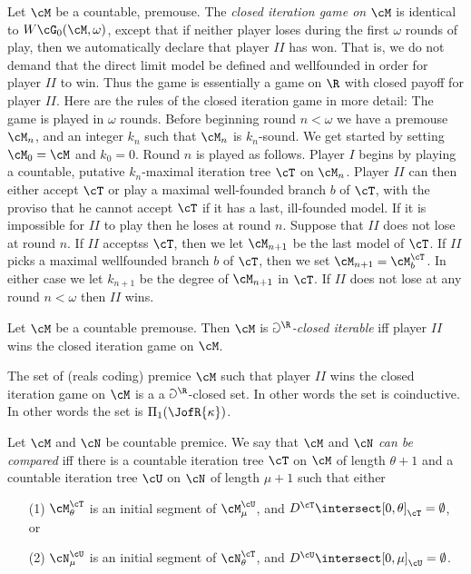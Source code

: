 Let $\cM$ be a countable, premouse. The \emph{closed iteration game on
$\cM$}  is identical to $W\cG_{0}(\cM,\omega)$,
except that if neither player loses during  the first
$\omega$ rounds of play, then we automatically
declare that player $II$ has won.
That is, we do not demand that the direct limit model be defined
and wellfounded
in order for player $II$ to win. Thus the game is essentially a
game on $\R$ with closed payoff for player $II$. Here are the
rules of the closed iteration game in more detail: The game is played
in $\omega$ rounds. Before beginning round $n<\omega$ we have a premouse
$\cM_n$, and an integer $k_n$ such that $\cM_n$ is $k_n$-sound.
We get started by setting $\cM_0=\cM$ and $k_0=0$. Round $n$ is played
as follows. Player $I$ begins by playing a countable, putative
$k_n$-maximal iteration tree $\cT$ on $\cM_n$. Player $II$ can then either
accept $\cT$ or play a maximal well-founded branch $b$ of $\cT$, with
the proviso that he cannot accept $\cT$ if it has a last, ill-founded
model. If it is impossible for $II$ to play then he loses at
round $n$. Suppose that $II$ does not lose at round $n$.
If $II$ acceptss $\cT$, then we let $\cM_{n+1}$ be the last model
of $\cT$. If $II$  picks a maximal wellfounded branch $b$ of  $\cT$,
then we set $\cM_{n+1}=\cM^{\cT}_{b}$. In either case we let
$k_{n+1}$ be the degree of $\cM_{n+1}$ in $\cT$. If $II$ does not
lose at any round $n<\omega$ then $II$ wins.

\begin{definition}
Let $\cM$ be a countable premouse. Then $\cM$ is \emph{$\Game^{\R}$-closed
iterable} iff player $II$ wins the closed iteration game on
$\cM$.
\end{definition}

\begin{remark}
The set of (reals coding) premice $\cM$ such that player $II$ wins the
closed iteration game on $\cM$ is a a $\Game^{\R}$-closed set.
In other words the set is coinductive.
In other words the set is $\Pi_1(\JofR{\kappa})$.
\end{remark}

Let $\cM$ and $\cN$ be countable premice. We say that $\cM$ and
$\cN$ \emph{can be compared} iff there is a countable iteration
tree $\cT$ on $\cM$ of length $\theta+1$
 and a countable iteration tree $\cU$ on $\cN$ of length $\mu+1$
such that either
\begin{itemize}
\item[(1)] $\cM^{\cT}_{\theta}$ is an initial segment of $\cM^{\cU}_{\mu}$,
and $D^{\cT}\intersect[0,\theta]_{\cT}=\emptyset$, or
\item[(2)] $\cN^{\cU}_{\mu}$ is an initial segment of $\cN^{\cT}_{\theta}$,
and $D^{\cU}\intersect[0,\mu]_{\cU}=\emptyset$.
\end{itemize}

